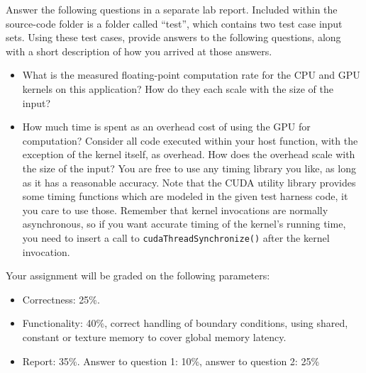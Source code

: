 \documentclass[11.5pt]{article}
\begin{document}
\noindent Answer the following questions in a separate lab report. Included within the source-code folder is a folder called ``test'', which contains two test case input sets.  Using these test cases, provide answers to the following questions, along with a short description of how you arrived at those answers.
\begin{itemize}
\item What is the measured floating-point computation rate for the CPU and GPU kernels
    on this application?  How do they each scale with the size of the input?

\item  How much time is spent as an overhead cost of using the GPU for computation?  Consider all code executed within your host function, with the exception of the kernel itself, as overhead. How does the overhead scale with the size of the input? You are free to use any timing library you like, as long as it has a reasonable accuracy.  Note that the CUDA utility library provides some timing functions which are modeled in the given test harness code, it you care to use those. Remember that kernel invocations are normally asynchronous, so if you want accurate timing of the kernel's running time, you need to insert a call to \texttt{cudaThreadSynchronize()} after the kernel invocation.
\end{itemize}
\vspace{24pt}

\noindent Your assignment will be graded on the following parameters:
\begin{itemize}
\item Correctness: 25\%.

\item Functionality: 40\%, correct handling of boundary conditions, using shared, constant or texture memory to cover global memory latency.
    
\item Report: 35\%. Answer to question 1: 10\%, answer to question 2: 25\%
\end{itemize}
\end{document}
